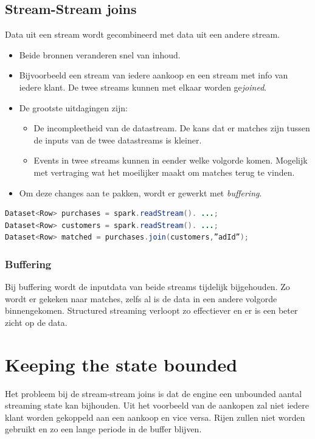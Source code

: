 \documentclass[a4paper,10pt,twoside]{report}
\begin{document}
\subsection{Stream-Stream joins}

Data uit een stream wordt gecombineerd met data uit een andere stream. 

\begin{itemize}
\item Beide bronnen veranderen snel van inhoud. 
\item Bijvoorbeeld een stream van iedere aankoop en een stream met info van iedere klant. De twee streams kunnen met elkaar worden ge\textit{joined}.
\item De grootste uitdagingen zijn:
\begin{itemize}
\item De incompleetheid van de datastream. De kans dat er matches zijn tussen de inputs van de twee datastreams is kleiner. 
\item Events in twee streams kunnen in eender welke volgorde komen. Mogelijk met vertraging wat het moeilijker maakt om matches terug te vinden.
\end{itemize} 
\item Om deze changes aan te pakken, wordt er gewerkt met \textit{buffering}. 
\end{itemize}

\begin{lstlisting}[language=Java]
Dataset<Row> purchases = spark.readStream(). ...;
Dataset<Row> customers = spark.readStream(). ...;
Dataset<Row> matched = purchases.join(customers,”adId”);
\end{lstlisting}

\subsubsection{Buffering}

Bij buffering wordt de inputdata van beide streams tijdelijk bijgehouden. Zo wordt er gekeken naar matches, zelfs al is de data in een andere volgorde binnengekomen. Structured streaming verloopt zo effectiever en er is een beter zicht op de data.

\section{Keeping the state bounded}

Het probleem bij de stream-stream joins is dat de engine een unbounded aantal streaming state kan bijhouden. Uit het voorbeeld van de aankopen zal niet iedere klant worden gekoppeld aan een aankoop en vice versa. Rijen zullen niet worden gebruikt en zo een lange periode in de buffer blijven.
\end{document}
